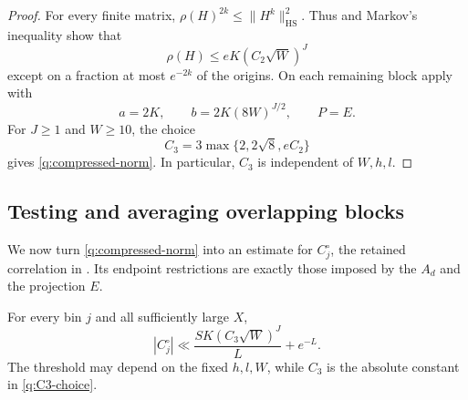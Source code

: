 \begin{proof}
For every finite matrix, $\rho(H)^{2k}\le\|H^k\|_{\mathrm{HS}}^2$.
Thus  and Markov's inequality show that
\[
 \rho(H)\le eK(C_2\sqrt W)^J
\]
except on a fraction at most $e^{-2k}$ of the origins. On each remaining
block apply  with
\[
 a=2K,\qquad b=2K(8W)^{J/2},\qquad P=E.
\]
For $J\ge1$ and $W\ge10$, the choice
\begin{equation}\label{q:C3-choice}
 C_3=3\max\{2,2\sqrt8,eC_2\}
\end{equation}
gives \eqref{q:compressed-norm}. In particular, $C_3$ is independent of
$W,h,l$.
\end{proof}

\subsection{Testing and averaging overlapping blocks}

We now turn \eqref{q:compressed-norm} into an estimate for $C_j^\circ$,
the retained correlation in . Its endpoint restrictions
are exactly those imposed by the $A_d$ and the projection $E$.

\begin{proposition}\label{q:testing}
For every bin $j$ and all sufficiently large $X$,
\begin{equation}\label{q:bin-estimate}
 |C_j^\circ|\ll \frac{S K(C_3\sqrt W)^J}{L}+e^{-L}.
\end{equation}
The threshold may depend on the fixed $h,l,W$, while $C_3$ is the
absolute constant in \eqref{q:C3-choice}.
\end{proposition}

